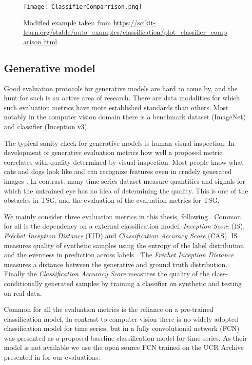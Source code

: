\documentclass[../../thesis.tex]{subfiles}
\begin{document}
\begin{figure}[h]
    \label{fig:ClassifierComparrison}
    \texttt{[image: ClassifierComparrison.png]}
    \centering
    \caption{Modified example taken from \url{https://scikit-learn.org/stable/auto_examples/classification/plot_classifier_comparison.html}.}
\end{figure}

\subsection{Generative model}
Good evaluation protocols for generative models are hard to come by, and the hunt for such is an active area of research. There are data modalities for which such evaluation metrics have more established standards than others. Most notably in the computer vision domain there is a benchmark dataset (ImageNet) and classifier (Inception v3). \newline

The typical sanity check for generative models is human visual inspection. In development of generative evaluation metrics how well a proposed metric correlates with quality determined by visual inspection. Most people know what cats and dogs look like and can recognize features even in crudely generated images . In contrast, many time series dataset measure quantities and signals for which the untrained eye has no idea of determining the quality. This is one of the obstacles in TSG, and the evaluation of the evaluation metrics for TSG. \newline 

We mainly consider three evaluation metrics in this thesis, following \cite{TimeVQVAE}. Common for all is the dependency on a external classification model. \textit{Inception Score} (IS), \textit{Fréchet Inception Distance} (FID) and \textit{Classification Accuracy Score} (CAS).
IS measures quality of synthetic samples using the entropy of the label distribution and the evenness in prediction across labels . The \textit{Fréchet Inception Distance} measures a distance between the generative and ground truth distribution. Finally the \textit{Classification Accuracy Score} measures the quality of the class-conditionally generated samples by training a classifier on synthetic and testing on real data.

Common for all the evaluation metrics is the reliance on a pre-trained classification model. In contrast to computer vision there is no widely adopted classification model for time series, but in \cite{wang2016time} a fully convolutional network (FCN) was presented as a proposed baseline classification model for time series. As their model is not available we use the open source FCN trained on the UCR Archive presented in \cite{TimeVQVAE} for our evaluations. \newline
\end{document}
